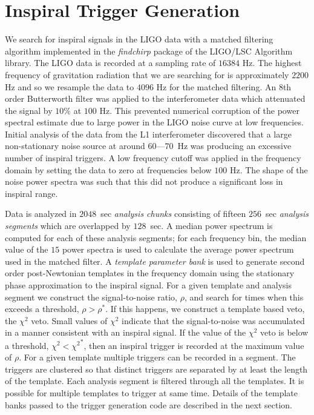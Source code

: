\section{Inspiral Trigger Generation}
\label{s:trigger}

We search for inspiral signals in the LIGO data with a matched
filtering\cite{wz} algorithm implemented in the \emph{findchirp}
package\cite{findchirp} of the LIGO/LSC Algorithm library\cite{lal}. The LIGO
data is recorded at a sampling rate of $16384$ Hz.  The highest frequency of
gravitation radiation that we are searching for is approximately $2200$ Hz and
so we resample the data to $4096$ Hz for the matched filtering.  An 8th order
Butterworth filter was applied to the interferometer data which attenuated the
signal by $10\%$ at $100$ Hz. This prevented numerical corruption of the power
spectral estimate due to large power in the LIGO noise curve at low
frequencies. Initial analysis of the data from the L1 interferometer
discovered that a large non-stationary noise source at around $60$---$70$~Hz
was producing an excessive number of inspiral triggers. A low frequency cutoff
was applied in the frequency domain by setting the data to zero at frequencies
below $100$ Hz.  The shape of the noise power spectra was such that this did
not produce a significant loss in inspiral range. 

Data is analyzed in $2048$~sec \emph{analysis chunks} consisting of fifteen
$256$~sec \emph{analysis segments} which are overlapped by $128$~sec. A median
power spectrum is computed for each of these analysis segments; for each
frequency bin, the median value of the $15$ power spectra is used to
calculate the average power spectrum used in the matched filter.  A
\emph{template parameter bank} is used to generate second order post-Newtonian
templates in the frequency domain using the stationary phase approximation to
the inspiral signal. For a given template
and analysis segment we construct the signal-to-noise ratio, $\rho$,  and
search for times when this exceeds a threshold,  $\rho > \rho^\ast$. If this
happens, we construct a template based veto, the $\chi^2$
veto\cite{brucechisq}. Small values of $\chi^2$ indicate that the
signal-to-noise was accumulated in a manner consistent with an inspiral
signal. If the value of the $\chi^2$ veto is below a threshold, $\chi^2 <
{\chi^2}^\ast$, then an inspiral trigger is recorded at the maximum value of
$\rho$. For a given template multiple triggers can be recorded in a segment.
The triggers are clustered so that distinct triggers are separated by at least
the length of the template.  Each analysis segment is filtered through all the
templates. It is possible for multiple templates to trigger at same time.
Details of the template banks passed to the trigger generation code are
described in the next section. 

